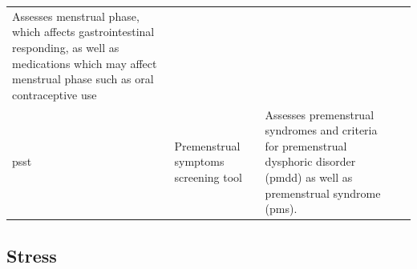 \documentclass[]{book}
\begin{document}
\begin{longtable}[]{@{}llll@{}}
\begin{minipage}[t]{0.22\columnwidth}
Assesses menstrual phase, which affects gastrointestinal responding, as well as medications which may affect menstrual phase such as oral contraceptive use\strut
\end{minipage} & \begin{minipage}[t]{0.18\columnwidth}\raggedright
\strut
\end{minipage}\tabularnewline
\begin{minipage}[t]{0.22\columnwidth}\raggedright
psst\strut
\end{minipage} & \begin{minipage}[t]{0.27\columnwidth}\raggedright
Premenstrual symptoms screening tool\strut
\end{minipage} & \begin{minipage}[t]{0.22\columnwidth}\raggedright
Assesses premenstrual syndromes and criteria for premenstrual dysphoric disorder (pmdd) as well as premenstrual syndrome (pms).\strut
\end{minipage} & \begin{minipage}[t]{0.18\columnwidth}\raggedright
\strut
\end{minipage}\tabularnewline
\bottomrule
\end{longtable}

\hypertarget{stress-1}{%
\subsection{Stress}\label{stress-1}}
\end{document}
